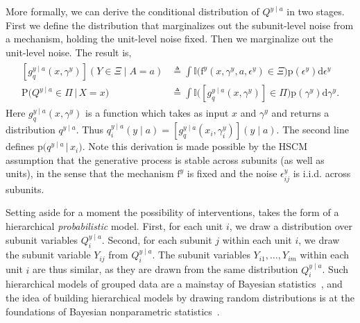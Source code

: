 \documentclass[12pt]{article}
\newcommand{\di}{\mathrm{d}}
\newcommand{\pr}{\mathrm{p}}
\newcommand{\Prob}{\mathrm{P}}
\newcommand{\f}{\mathrm{f}}
\begin{document}
More formally, we can derive the conditional distribution of $Q^{y\mid a}$ in two stages. First we define the distribution that marginalizes out the subunit-level noise from a mechanism, holding the unit-level noise fixed. Then we marginalize out the unit-level noise. The result is,
\begin{align*}
  \begin{split}
    [g^{y \mid a}_q(x, \gamma^{y})](Y \in \Xi \mid A= a) &\triangleq \int \mathbb{I}\Big(\f^{y}(x, \gamma^y, a, \epsilon^{y}) \in \Xi \Big) \pr(\epsilon^{y}) \di\epsilon^{y}\\
    \Prob\big(Q^{y \mid a} \in \Pi \, \big|\, X = x\big) &\triangleq \int \mathbb{I}\Big([g^{y \mid a}_q(x, \gamma^{y})] \in \Pi \Big) \pr(\gamma^{y}) \di\gamma^{y}.
  \end{split}
\end{align*}
Here $g^{y \mid a}_q(x, \gamma^{y})$ is a function which takes as input $x$ and $\gamma^{y}$ and returns a distribution $q^{y \mid a}$.  Thus $q^{y \mid a}_i(y \mid a) = [g^{y \mid a}_q(x_i, \gamma^{y}_i)](y \mid a)$.  The second line defines $\pr\big(q^{y \mid a}\, \big|\, x_i\big)$.  Note this derivation is made possible by the HSCM assumption that the generative process is stable across subunits (as well as units), in the sense that the mechanism $\f^y$ is fixed and the noise $\epsilon^y_{ij}$ is i.i.d. across subunits.

Setting aside for a moment the possibility of interventions,  takes the form of a hierarchical \textit{probabilistic} model.  First, for each unit $i$, we draw a distribution over subunit variables $Q_i^{y \mid a}$. Second, for each subunit $j$ within each unit $i$, we draw the subunit variable $Y_{ij}$ from $Q_i^{y \mid a}$.  The subunit variables $Y_{i1}, \ldots, Y_{im}$ within each unit $i$ are thus similar, as they are drawn from the same distribution $Q_i^{y \mid a}$. Such hierarchical models of grouped data are a mainstay of Bayesian statistics~\citep[e.g.][]{Gelman2006-ft}, and the idea of building hierarchical models by drawing random distributions is at the foundations of Bayesian nonparametric statistics~\citep[e.g.][]{Ghosh2003-yv}.
\end{document}
